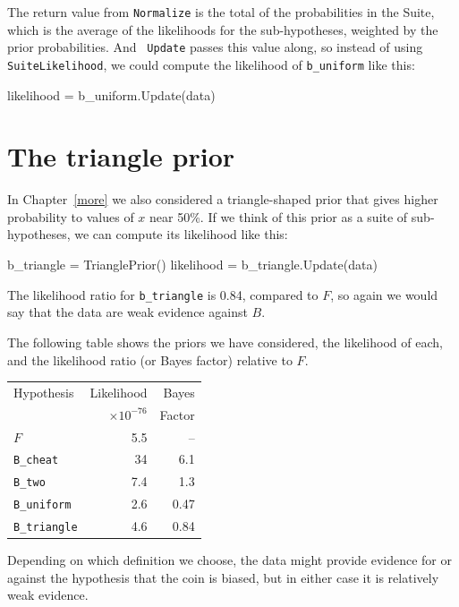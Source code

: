 \documentclass[12pt]{book}
\theoremstyle{exercise}
\newcommand{\py}[1]{{\tt #1}}%
\begin{document}
The return value from \py{Normalize} is the total of the
probabilities in the Suite, which is the average of the likelihoods
for the sub-hypotheses, weighted by the prior probabilities.  And {\tt
  Update} passes this value along, so instead of using {\tt
  SuiteLikelihood}, we could compute the likelihood of
\verb"b_uniform" like this:

\begin{code}
    likelihood = b_uniform.Update(data)
\end{code}



\section{The triangle prior}

In Chapter~\ref{more} we also considered a triangle-shaped prior that
gives higher probability to values of $x$ near 50\%.  If we think of
this prior as a suite of sub-hypotheses, we can compute its likelihood
like this:

\begin{code}
    b_triangle = TrianglePrior()
    likelihood = b_triangle.Update(data)
\end{code}

The likelihood ratio for \verb"b_triangle" is 0.84, compared to $F$, so
again we would say that the data are weak evidence against $B$.

The following table shows the priors we have considered, the
likelihood of each, and the likelihood ratio (or Bayes factor)
relative to $F$.

\begin{tabular}{|l|r|r|}
\hline
Hypothesis   & Likelihood & Bayes  \\
             & $\times 10^{-76}$ & Factor  \\
\hline
$F$              & 5.5   & --   \\
\verb"B_cheat"  & 34   &  6.1   \\
\verb"B_two"     & 7.4   &  1.3   \\
\verb"B_uniform"  & 2.6   &  0.47   \\
\verb"B_triangle"  & 4.6   &  0.84   \\
\hline
\end{tabular}

Depending on which definition we choose, the data might provide
evidence for or against the hypothesis that the coin is biased, but
in either case it is relatively weak evidence.
\end{document}
